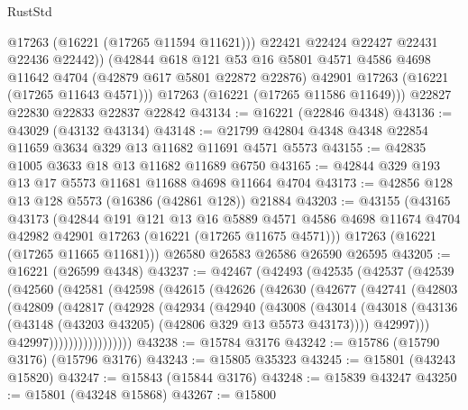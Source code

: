 \begin{lexlean}{RustStd}
\begin{coremodule}
            @17263
            (@16221 (@17265 @11594 @11621)))
          @22421
          @22424
          @22427
          @22431
          @22436
          @22442))
      (@42844
        @618
        @121
        @53
        @16
        @5801
        @4571
        @4586
        @4698
        @11642
        @4704
        (@42879 @617 @5801 @22872 @22876)
        @42901
        @17263
        (@16221 (@17265 @11643 @4571)))
      @17263
      (@16221 (@17265 @11586 @11649)))
    @22827
    @22830
    @22833
    @22837
    @22842
@43134 := @16221 (@22846 @4348)
@43136 := @43029 (@43132 @43134)
@43148 := @21799 @42804 @4348 @4348 @22854 @11659 @3634 @329 @13 @11682 @11691 @4571 @5573
@43155 := @42835 @1005 @3633 @18 @13 @11682 @11689 @6750
@43165 := @42844 @329 @193 @13 @17 @5573 @11681 @11688 @4698 @11664 @4704
@43173 := @42856 @128 @13 @128 @5573 (@16386 (@42861 @128)) @21884
@43203 := @43155
    (@43165
      @43173
      (@42844
        @191
        @121
        @13
        @16
        @5889
        @4571
        @4586
        @4698
        @11674
        @4704
        @42982
        @42901
        @17263
        (@16221 (@17265 @11675 @4571)))
      @17263
      (@16221 (@17265 @11665 @11681)))
    @26580
    @26583
    @26586
    @26590
    @26595
@43205 := @16221 (@26599 @4348)
@43237 := @42467
    (@42493
      (@42535
        (@42537
          (@42539
            (@42560
              (@42581
                (@42598
                  (@42615
                    (@42626
                      (@42630
                        (@42677
                          (@42741
                            (@42803
                              (@42809
                                (@42817
                                  (@42928
                                    (@42934
                                      (@42940
                                        (@43008
                                          (@43014
                                            (@43018
                                              (@43136
                                                (@43148
                                                  (@43203 @43205)
                                                  (@42806 @329 @13 @5573 @43173))))
                                            @42997)))
                                      @42997)))))))))))))))))
@43238 := @15784 @3176
@43242 := @15786 (@15790 @3176) (@15796 @3176)
@43243 := @15805 @35323
@43245 := @15801 (@43243 @15820)
@43247 := @15843 (@15844 @3176)
@43248 := @15839 @43247
@43250 := @15801 (@43248 @15868)
@43267 := @15800

\end{coremodule}
\end{lexlean}
